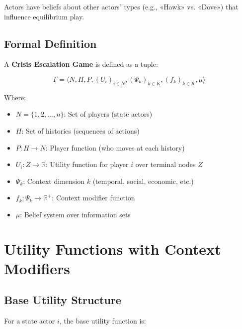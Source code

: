 \begin{axiom}
\label{ax:incomplete}
Actors have beliefs about other actors' types (e.g., «Hawk» vs. «Dove») that influence equilibrium play.
\end{axiom}

\subsection{Formal Definition}

A \textbf{Crisis Escalation Game} is defined as a tuple:

\begin{equation}
\Gamma = \langle N, H, P, (U_i)_{i \in N}, (\Psi_k)_{k \in K}, (f_k)_{k \in K}, \mu \rangle
\end{equation}

Where:
\begin{itemize}
\item $N = \{1, 2, ..., n\}$: Set of players (state actors)
\item $H$: Set of histories (sequences of actions)
\item $P: H \rightarrow N$: Player function (who moves at each history)
\item $U_i: Z \rightarrow \mathbb{R}$: Utility function for player $i$ over terminal nodes $Z$
\item $\Psi_k$: Context dimension $k$ (temporal, social, economic, etc.)
\item $f_k: \Psi_k \rightarrow \mathbb{R}^+$: Context modifier function
\item $\mu$: Belief system over information sets
\end{itemize}



\section{Utility Functions with Context Modifiers}
\label{sec:crisis-utility}

\subsection{Base Utility Structure}

For a state actor $i$, the base utility function is:


